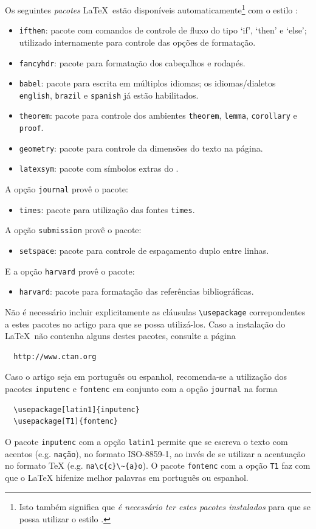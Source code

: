 \documentclass[conference,harvard,brazil,english]{sbatex}
\begin{document}
Os seguintes \emph{pacotes} \LaTeX\ estão disponíveis
automaticamente\footnote{Isto também significa que \emph{é necessário
ter estes pacotes instalados} para que se possa utilizar o estilo
\SBATeX.} com o estilo \SBATeX:
\begin{itemize}
\item \verb+ifthen+: pacote com comandos de controle de fluxo do tipo
`if', `then' e `else'; utilizado internamente para controle das opções de
formatação.
\item \verb+fancyhdr+: pacote para formatação dos cabeçalhos e rodapés.
\item \verb+babel+: pacote para escrita em múltiplos idiomas; os
idiomas/dialetos \verb+english+, \verb+brazil+ e \verb+spanish+ já
estão habilitados.
\item \verb+theorem+: pacote para controle dos ambientes \verb+theorem+,
\verb+lemma+, \verb+corollary+ e \verb+proof+.
\item \verb+geometry+: pacote para controle da dimensões do texto na página.
\item \verb+latexsym+: pacote com símbolos extras do \LaTeXe.
\end{itemize}
A opção \verb+journal+ provê o pacote:
\begin{itemize}
\item \verb+times+: pacote para utilização das fontes \verb+times+.
\end{itemize}
A opção \verb+submission+ provê o pacote:
\begin{itemize}
\item \verb+setspace+: pacote para controle de espaçamento duplo entre
linhas.
\end{itemize}
E a opção \verb+harvard+ provê o pacote:
\begin{itemize}
\item \verb+harvard+: pacote para formatação das referências
bibliográficas.
\end{itemize}

Não é necessário incluir explicitamente as cláusulas
\verb+\usepackage+ correpondentes a estes pacotes no artigo para que
se possa utilizá-los. Caso a instalação do \LaTeX\ não contenha alguns
destes pacotes, consulte a página
\begin{verbatim}
  http://www.ctan.org
\end{verbatim}

Caso o artigo seja em português ou espanhol, recomenda-se a utilização
dos pacotes \verb+inputenc+ e \verb+fontenc+ em conjunto com a opção
\verb+journal+ na forma
\begin{verbatim}
  \usepackage[latin1]{inputenc}
  \usepackage[T1]{fontenc}
\end{verbatim}
O pacote \verb+inputenc+ com a opção \verb+latin1+ permite que se
escreva o texto com acentos (e.g. \verb+nação+), no formato
ISO-8859-1, ao invés de se utilizar a acentuação no formato \TeX
(e.g. \verb+na\c{c}\~{a}o+). O pacote \verb+fontenc+ com a opção
\verb+T1+ faz com que o LaTeX hifenize melhor palavras em português ou
espanhol.
\end{document}
